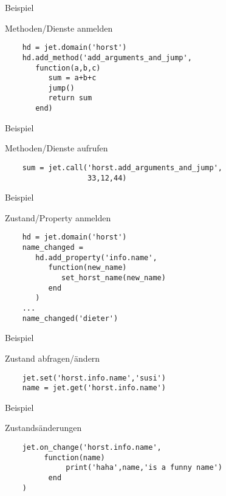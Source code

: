 \documentclass[xelatex,hyperref={pdfpagelabels=false}]{beamer}
\begin{document}
\begin{frame}[fragile]{Beispiel}
  \begin{block}{Methoden/Dienste anmelden}
  \begin{lstlisting}
    hd = jet.domain('horst')
    hd.add_method('add_arguments_and_jump',
       function(a,b,c)
          sum = a+b+c
          jump()
          return sum
       end)
  \end{lstlisting}
\end{block}
\end{frame}

\begin{frame}[fragile]{Beispiel}
  \begin{block}{Methoden/Dienste aufrufen}
  \begin{lstlisting}
    sum = jet.call('horst.add_arguments_and_jump',
                   33,12,44)
  \end{lstlisting}
\end{block}
\end{frame}

\begin{frame}[fragile]{Beispiel}
  \begin{block}{Zustand/Property anmelden}
  \begin{lstlisting}
    hd = jet.domain('horst')
    name_changed = 
       hd.add_property('info.name',
          function(new_name)
             set_horst_name(new_name)
          end
       )
    ...
    name_changed('dieter')
  \end{lstlisting}
\end{block}
\end{frame}

\begin{frame}[fragile]{Beispiel}
  \begin{block}{Zustand abfragen/ändern}
  \begin{lstlisting}
    jet.set('horst.info.name','susi')
    name = jet.get('horst.info.name')
  \end{lstlisting}
\end{block}
\end{frame}

\begin{frame}[fragile]{Beispiel}
  \begin{block}{Zustandsänderungen}
  \begin{lstlisting}
    jet.on_change('horst.info.name',
         function(name)
              print('haha',name,'is a funny name')
          end
    )
  \end{lstlisting}
\end{block}
\end{frame}
\end{document}

